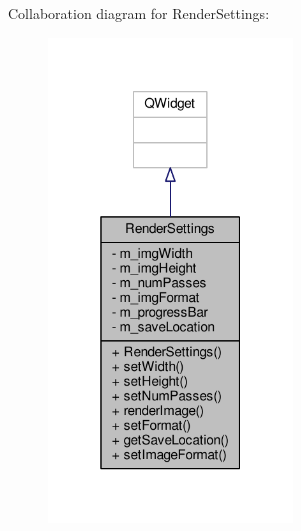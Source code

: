 Collaboration diagram for Render\-Settings\-:
\nopagebreak
\begin{figure}[H]
\begin{center}
\leavevmode
\includegraphics[width=184pt]{class_render_settings__coll__graph}
\end{center}
\end{figure}
